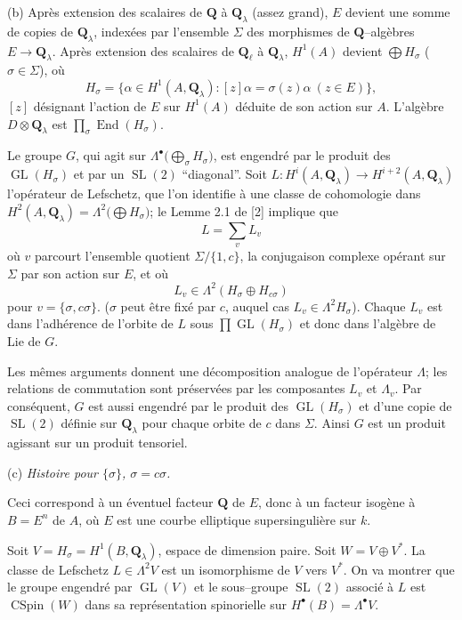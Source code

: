 \documentclass[11pt,a4paper]{article}
\theoremstyle{plain}
\theoremstyle{definition}
\DeclareMathOperator{\End}{End}
\DeclareMathOperator{\CSpin}{CSpin}
\DeclareMathOperator{\SL}{SL}
\DeclareMathOperator{\GL}{GL}
\begin{document}
(b) Apr\`es extension des scalaires de $\mathbf{Q}$ \`a $\mathbf{Q}_\lambda$ (assez grand), $E$ devient une somme de copies de $\mathbf{Q}_\lambda$, index\'ees par l'ensemble $\Sigma$ des morphismes de $\mathbf{Q}$--alg\`ebres $E \to \mathbf{Q}_\lambda$. Apr\`es extension des scalaires de $\mathbf{Q}_\ell$ \`a $\mathbf{Q}_\lambda$, $H^1(A)$ devient $\bigoplus H_\sigma$ ($\sigma \in \Sigma$), o\`u
\[
H_\sigma = \{\alpha \in H^1(A, \mathbf{Q}_\lambda) : [z]\alpha = \sigma(z)\alpha \ (z \in E)\} ,
\]
$[z]$ d\'esignant l'action de $E$ sur $H^1(A)$ d\'eduite de son action sur $A$. L'alg\`ebre $D \otimes \mathbf{Q}_\lambda$ est $\prod_\sigma \End(H_\sigma)$.

Le groupe $G$, qui agit sur $\Lambda^\bullet\bigl(\bigoplus_\sigma H_\sigma\bigr)$, est engendr\'e par le produit des $\GL(H_\sigma)$ et par un $\SL(2)$ ``diagonal''. Soit $L : H^i(A, \mathbf{Q}_\lambda) \to H^{i+2}(A, \mathbf{Q}_\lambda)$ l'op\'erateur de Lefschetz, que l'on identifie \`a une classe de cohomologie dans $H^2(A, \mathbf{Q}_\lambda) = \Lambda^2\bigl(\bigoplus H_\sigma\bigr)$; le Lemme 2.1 de [2] implique que
\[
L = \sum_v L_v
\]
o\`u $v$ parcourt l'ensemble quotient $\Sigma/\{1, c\}$, la conjugaison complexe op\'erant sur $\Sigma$ par son action sur $E$, et o\`u
\[
L_v \in \Lambda^2(H_\sigma \oplus H_{c\sigma})
\]
pour $v = \{\sigma, c\sigma\}$. ($\sigma$ peut \^etre fix\'e par $c$, auquel cas $L_v \in \Lambda^2 H_\sigma$). Chaque $L_v$ est dans l'adh\'erence de l'orbite de $L$ sous $\prod \GL(H_\sigma)$ et donc dans l'alg\`ebre de Lie de $G$.

Les m\^emes arguments donnent une d\'ecomposition analogue de l'op\'erateur $\Lambda$; les relations de commutation sont pr\'eserv\'ees par les composantes $L_v$ et $\Lambda_v$. Par cons\'equent, $G$ est aussi engendr\'e par le produit des $\GL(H_\sigma)$ et d'une copie de $\SL(2)$ d\'efinie sur $\mathbf{Q}_\lambda$ pour chaque orbite de $c$ dans $\Sigma$. Ainsi $G$ est un produit agissant sur un produit tensoriel.

(c) \textit{Histoire pour $\{\sigma\}$, $\sigma = c\sigma$.}

Ceci correspond \`a un \'eventuel facteur $\mathbf{Q}$ de $E$, donc \`a un facteur isog\`ene \`a $B = E^n$ de $A$, o\`u $E$ est une courbe elliptique supersinguli\`ere sur $k$.

Soit $V = H_\sigma = H^1(B, \mathbf{Q}_\lambda)$, espace de dimension paire. Soit $W = V \oplus V^*$. La classe de Lefschetz $L \in \Lambda^2 V$ est un isomorphisme de $V$ vers $V^*$. On va montrer que le groupe engendr\'e par $\GL(V)$ et le sous--groupe $\SL(2)$ associ\'e \`a $L$ est $\CSpin(W)$ dans sa repr\'esentation spinorielle sur $H^\bullet(B) = \Lambda^\bullet V$.
\end{document}

